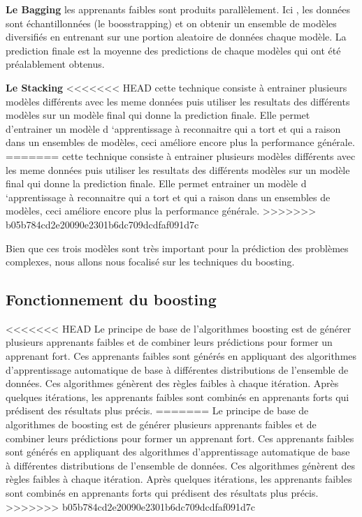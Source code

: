 \documentclass[french,a4paper,12pt]{article}
\begin{document}
\textbf{Le Bagging} 
\quad les apprenants faibles sont produits parallèlement. Ici , les données sont échantillonnées (le boosstrapping) et on obtenir un ensemble de modèles diversifiés en entrenant sur une portion aleatoire de données chaque modèle. La prediction finale est la moyenne des predictions de chaque modèles qui ont été préalablement obtenus. 

\textbf{Le Stacking}
<<<<<<< HEAD
\quad cette technique consiste à entrainer plusieurs modèles différents avec les meme données puis utiliser les resultats des différents modèles  sur un modèle final qui donne la prediction finale. Elle permet d'entrainer un modèle d ‘apprentissage à reconnaitre qui a tort et qui a raison dans un ensembles de modèles, ceci améliore encore plus la performance générale. 
=======
\quad cette technique consiste à entrainer plusieurs modèles différents avec les meme données puis utiliser les resultats des différents modèles  sur un modèle final qui donne la prediction finale. Elle permet entrainer un modèle d ‘apprentissage à reconnaitre qui a tort et qui a raison dans un ensembles de modèles, ceci améliore encore plus la performance générale. 
>>>>>>> b05b784cd2e20090e2301b6dc709dcdfaf091d7c

\quad Bien que ces trois modèles sont très important pour la prédiction des problèmes complexes, nous allons nous focalisé sur les techniques du boosting.


 

\subsection{Fonctionnement du boosting}
<<<<<<< HEAD
\quad Le principe de base de l'algorithmes  boosting est de générer plusieurs apprenants faibles et de combiner leurs prédictions pour former un apprenant fort. Ces apprenants faibles sont générés en appliquant des algorithmes d'apprentissage automatique de base à différentes distributions de l'ensemble de données\citep{educa}. Ces algorithmes génèrent des règles faibles à chaque itération. Après quelques itérations, les apprenants faibles sont combinés en apprenants forts qui prédisent des résultats plus précis.
=======
\quad Le principe de base de algorithmes de boosting est de générer plusieurs apprenants faibles et de combiner leurs prédictions pour former un apprenant fort. Ces apprenants faibles sont générés en appliquant des algorithmes d'apprentissage automatique de base à différentes distributions de l'ensemble de données.\citep{educa} Ces algorithmes génèrent des règles faibles à chaque itération. Après quelques itérations, les apprenants faibles sont combinés en apprenants forts qui prédisent des résultats plus précis.
>>>>>>> b05b784cd2e20090e2301b6dc709dcdfaf091d7c
\end{document}
